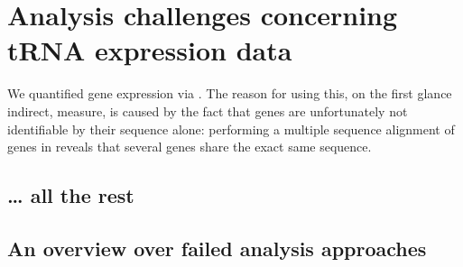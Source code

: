 \chapter{Analysis challenges concerning tRNA expression data}

We quantified \trna gene expression via  \chipseq. The reason for using
this, on the first glance indirect, measure, is caused by the fact that \trna
genes are unfortunately not identifiable by their sequence alone: performing a
multiple sequence alignment of \trna genes in \mmu reveals that several \trna
genes share the exact same sequence.

\section{… all the rest}

\section{An overview over failed analysis approaches}
